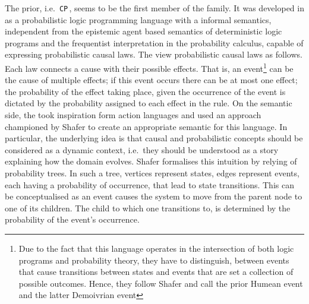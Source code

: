 \documentclass[11pt,a4paper]{book}
\theoremstyle{definition}
\theoremstyle{definition}
\theoremstyle{definition}
\theoremstyle{remark}
\newcommand{\cp}{\texttt{CP}\,}
\begin{document}
The prior, i.e.\ \cp, seems to be the first member of the family. It was developed in \parencite{vennekens2009cp} as a probabilistic logic programming language with a informal semantics, independent from the epistemic agent based semantics of deterministic logic programs and the frequentist interpretation in the probability calculus, capable of expressing probabilistic causal laws. 
The view probabilistic causal laws as follows. Each law connects a cause with their possible effects. That is, an event\footnote{Due to the fact that this language operates in the intersection of both logic programs and probability theory, they have to distinguish, between events that cause transitions between states and events that are set a collection of possible outcomes. Hence, they follow Shafer and call the prior Humean event and the latter Demoivrian event} can be the cause of multiple effects; if this event occurs there can be at most one effect; the probability of the effect taking place, given the occurrence of the event is dictated by the probability assigned to each effect in the rule.
On the semantic side, the took inspiration form action languages and used an approach championed by Shafer to create an appropriate semantic for this language.
In particular, the underlying idea is that causal and probabilistic concepts should be considered as a dynamic context, i.e.\ they should be understood as a story explaining how the domain evolves. 
Shafer formalises this intuition by relying of probability trees. In such a tree, vertices represent states, edges represent events, each having a probability of occurrence, that lead to state transitions. This can be conceptualised as an event causes the system to move from the parent node to one of its children. The child to which one transitions to, is determined by the probability of the event's occurrence.







\end{document}

